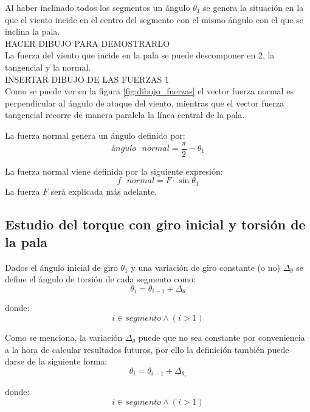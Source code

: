 Al haber inclinado todos los segmentos un ángulo $ \theta_1 $ se genera la situación en la que el viento incide en el centro del segmento con el mismo ángulo con el que se inclina la pala. \\

HACER DIBUJO PARA DEMOSTRARLO \\

La fuerza del viento que incide en la pala se puede descomponer en 2, la tangencial y la normal. \\

INSERTAR DIBUJO DE LAS FUERZAS 1 \\ %

Como se puede ver en la figura \ref{fig:dibujo_fuerzas} el vector fuerza normal es perpendicular al ángulo de ataque del viento, mientras que el vector fuerza tangencial recorre de manera paralela la línea central de la pala.

 \begin{definicion}
 La fuerza normal genera un ángulo definido por:
 $$ ángulo \text{ } normal = \dfrac{\pi}{2} - \theta_1 $$
 
 \end{definicion}

 \begin{definicion}
 La fuerza normal viene definida por la siguiente expresión:
  $$ f \text{ } normal = F \cdot \sin{\theta_1}$$
   La fuerza $F$ será explicada más adelante.
  \label{def:fuerza_normal}
 \end{definicion}



\subsection{Estudio del torque con giro inicial y torsión de la pala}



\begin{definicion}
Dados el ángulo inicial de giro $\theta_1 $ y una variación de giro constante (o no) $\Delta_\theta$ se define el ángulo de torsión de cada segmento como:
$$\theta_i = \theta_{i-1} + \Delta_\theta$$ 

    donde:
 $$i \in segmento \wedge (i > 1)$$
 
\label{def:theta_cte}
\end{definicion}



\begin{definicion}
Como se menciona, la variación $\Delta_\theta$ puede que no sea constante por conveniencia a la hora de calcular resultados futuros, por ello la definición también puede darse de la siguiente forma:
$$\theta_i = \theta_{i-1} + \Delta_{\theta_{i}}$$ 

    donde:
 $$i \in segmento \wedge (i > 1)$$
\label{def:theta_nocte}
\end{definicion}


